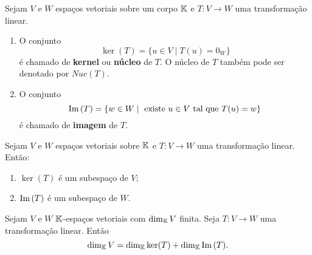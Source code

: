 \documentclass{beamer}
\begin{document}
\begin{frame}
    \begin{definicao}
        Sejam $V$ e $W$ espaços vetoriais sobre um corpo $\mathbb{K}$  e $T \colon V \to W$ uma transformação linear.
        \begin{enumerate}[label={\roman*})]
            \item O conjunto
            \[
            \ker(T)  = \{u \in V  \mid T(u) = 0_W\}
            \]
            é chamado de \textbf{kernel}  ou \textbf{núcleo} de $T$. O núcleo de $T$ também pode ser denotado por $Nuc(T)$.

            \vspace*{1.5cm}

            \item O conjunto
            \[
            {\rm Im\,}(T)  = \{w \in W  \mid \mbox{ existe }  u \in V  \mbox{ tal que }  T(u) = w\}
            \]
            é chamado de \textbf{imagem} de $T$.
        \end{enumerate}
    \end{definicao}
\end{frame}

\begin{frame}

    \begin{proposicao}
        Sejam $V$ e $W$ espaços vetoriais sobre $\mathbb{K}$  e $T \colon V \to W$ uma transformação linear.  Então:
        \begin{enumerate}[label={\roman*})]
            \item $\ker(T)$  é um subespaço de $V$;

            \vspace*{1cm}

            \item ${\rm Im\,}(T)$  é um subespaço de $W$.
        \end{enumerate}
    \end{proposicao}
\end{frame}

\begin{frame}
    \begin{teorema}\label{teorema_do_nucleo_e_da_imagem}
        Sejam $V$ e $W$ $\mathbb{K}$-espa\c{c}os vetoriais  com $\dim_{\mathbb{K}}V$ finita.  Seja $T \colon V \to W$ uma transforma\c{c}\~ao linear.  Ent\~ao
        \[
            \dim_{\mathbb{K}}V  = \dim_{\mathbb{K}}\ker(T)  + \dim_{\mathbb{K}}{\rm Im\,}(T).
        \]
    \end{teorema}
\end{frame}
\end{document}
